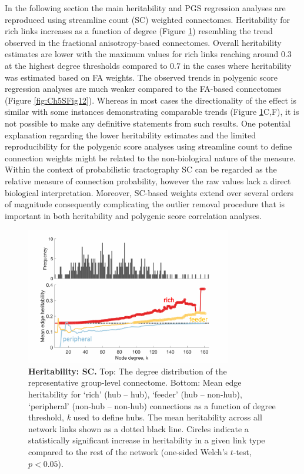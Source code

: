 \clearpage
In the following section the main heritability and PGS regression analyses are reproduced using streamline count (SC) weighted connectomes. Heritability for rich links increases as a function of degree (Figure \ref{fig:Ch5SFig11}) resembling the trend observed in the fractional anisotropy-based connectomes. Overall heritability estimates are lower with the maximum values for rich links reaching around $0.3$ at the highest degree thresholds compared to $0.7$ in the cases where heritability was estimated based on FA weights. The observed trends in polygenic score regression analyses are much weaker compared to the FA-based connectomes (Figure \ref{fig:Ch5SFig12}). Whereas in most cases the directionality of the effect is similar with some instances demonstrating comparable trends (Figure \ref{fig:Ch5SFig11}C,F), it is not possible to make any definitive statements from such results. One potential explanation regarding the lower heritability estimates and the limited reproducibility for the polygenic score analyses using streamline count to define connection weights might be related to the non-biological nature of the measure. Within the context of probabilistic tractography SC can be regarded as the relative measure of connection probability, however the raw values lack a direct biological interpretation. Moreover, SC-based weights extend over several orders of magnitude consequently complicating the outlier removal procedure that is important in both heritability and polygenic score correlation analyses. 

\begin{figure}[h!]
\begin{center}
\includegraphics[width=0.8\textwidth]{Chapter5/SFigure11.pdf}%
\end{center}
\caption{\textbf{Heritability: SC.} 
Top: The degree distribution of the representative group-level connectome. Bottom: Mean edge heritability for `rich' (hub -- hub), `feeder' (hub -- non-hub), `peripheral' (non-hub -- non-hub) connections as a function of degree threshold, \textit{k} used to define hubs. The mean heritability across all network links shown as a dotted black line. Circles indicate a statistically significant increase in heritability in a given link type compared to the rest of the network (one-sided Welch's $t$-test, $p < 0.05$). }
\label{fig:Ch5SFig11}
\end{figure}

